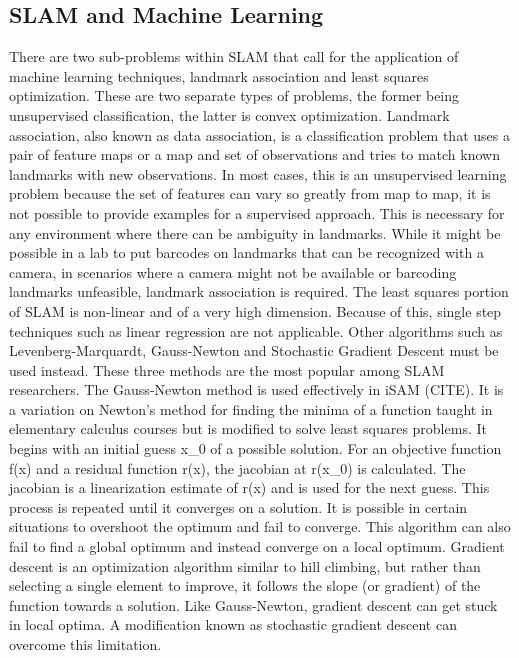 \subsection{SLAM and Machine Learning}
	There are two sub-problems within SLAM that call for the application of machine learning techniques, landmark association and least squares optimization.  These are two separate types of problems, the former being unsupervised classification, the latter is convex optimization.
Landmark association, also known as data association, is a classification problem that uses a pair of feature maps or a map and set of observations and tries to match known landmarks with new observations.  In most cases, this is an unsupervised learning problem because the set of features can vary so greatly from map to map, it is not possible to provide examples for a supervised approach.  This is necessary for any environment where there can be ambiguity in landmarks.  While it might be possible in a lab to put barcodes on landmarks that can be recognized with a camera, in scenarios where a camera might not be available or barcoding landmarks unfeasible, landmark association is required.
The least squares portion of SLAM is non-linear and of a very high dimension.  Because of this, single step techniques such as linear regression are not applicable.  Other algorithms such as Levenberg-Marquardt, Gauss-Newton and Stochastic Gradient Descent must be used instead.  These three methods are the most popular among SLAM researchers.  
	The Gauss-Newton method is used effectively in iSAM (CITE).  It is a variation on Newton’s method for finding the minima of a function taught in elementary calculus courses but is modified to solve least squares problems.  It begins with an initial guess x_0 of a possible solution.  For an objective function f(x) and a residual function r(x), the jacobian at r(x_0) is calculated.  The jacobian is a linearization estimate of r(x) and is used for the next guess.  This process is repeated until it converges on a solution.  It is possible in certain situations to overshoot the optimum and fail to converge.  This algorithm can also fail to find a global optimum and instead converge on a local optimum.
	Gradient descent is an optimization algorithm similar to hill climbing, but rather than selecting a single element to improve, it follows the slope (or gradient) of the function towards a solution.  Like Gauss-Newton, gradient descent can get stuck in local optima.  A modification known as stochastic gradient descent can overcome this limitation.  

